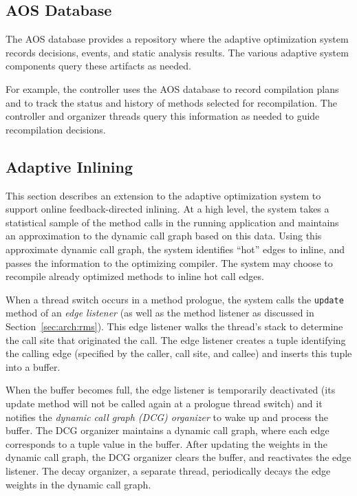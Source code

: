 \subsection{AOS Database}\label{sec:arch:db}
The AOS database provides a repository where the adaptive optimization 
system 
records decisions, events, and static analysis results. The various adaptive 
system components query these artifacts as needed. 

For example, the controller uses the AOS database to record
compilation plans and to track the status and history of methods
selected for recompilation.  The controller and organizer threads
query this information as needed to guide recompilation decisions.


\subsection{Adaptive Inlining}
This section describes an extension to the adaptive optimization
system to support online feedback-directed inlining.
At a high level, the system takes a statistical
sample of the method calls in the running application and maintains
an approximation to the dynamic call graph based on this data.
Using this approximate dynamic call graph, the system identifies
``hot'' edges to inline, and passes the information to the optimizing
compiler.  The system may choose to recompile already optimized
methods to inline hot call edges. 

When a thread switch occurs in a method prologue, the system calls the
{\tt update} method of an {\em edge listener} (as well as the method
listener as discussed in Section~\ref{sec:arch:rms}).  This edge
listener walks the thread's stack to determine the call site that
originated the call.  The edge listener creates a tuple identifying
the calling edge (specified by the caller, call site, and callee) and
inserts this tuple into a buffer.

When the buffer becomes full, the edge listener is temporarily
deactivated (its update method will not be called again at a prologue
thread switch) and it
notifies the 
{\em dynamic call graph (DCG) organizer} to wake up and process the
buffer. The DCG organizer maintains a dynamic call graph, where each 
edge corresponds to a tuple value in the buffer. After updating the
weights in the dynamic call graph, the DCG organizer clears the
buffer, and reactivates the edge listener.
The decay organizer, a separate thread, periodically decays the edge
weights in the dynamic call graph.

